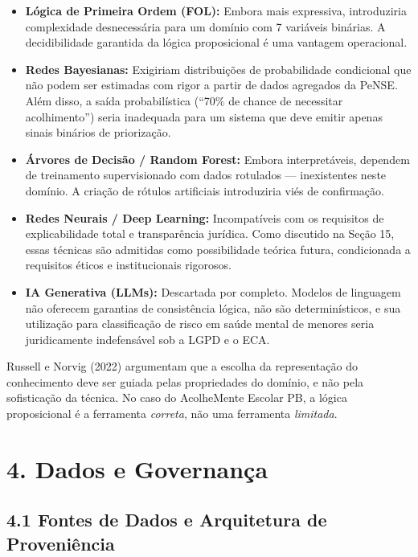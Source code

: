 \documentclass[11pt]{article}
\providecommand{\tightlist}{%
      \setlength{\itemsep}{0pt}\setlength{\parskip}{0pt}}
\begin{document}
\begin{itemize}
\tightlist
\item
  \textbf{Lógica de Primeira Ordem (FOL):} Embora mais expressiva,
  introduziria complexidade desnecessária para um domínio com 7
  variáveis binárias. A decidibilidade garantida da lógica proposicional
  é uma vantagem operacional.
\item
  \textbf{Redes Bayesianas:} Exigiriam distribuições de probabilidade
  condicional que não podem ser estimadas com rigor a partir de dados
  agregados da PeNSE. Além disso, a saída probabilística (``70\% de
  chance de necessitar acolhimento'') seria inadequada para um sistema
  que deve emitir apenas sinais binários de priorização.
\item
  \textbf{Árvores de Decisão / Random Forest:} Embora interpretáveis,
  dependem de treinamento supervisionado com dados rotulados ---
  inexistentes neste domínio. A criação de rótulos artificiais
  introduziria viés de confirmação.
\item
  \textbf{Redes Neurais / Deep Learning:} Incompatíveis com os
  requisitos de explicabilidade total e transparência jurídica. Como
  discutido na Seção 15, essas técnicas são admitidas como possibilidade
  teórica futura, condicionada a requisitos éticos e institucionais
  rigorosos.
\item
  \textbf{IA Generativa (LLMs):} Descartada por completo. Modelos de
  linguagem não oferecem garantias de consistência lógica, não são
  determinísticos, e sua utilização para classificação de risco em saúde
  mental de menores seria juridicamente indefensável sob a LGPD e o ECA.
\end{itemize}

Russell e Norvig (2022) argumentam que a escolha da representação do
conhecimento deve ser guiada pelas propriedades do domínio, e não pela
sofisticação da técnica. No caso do AcolheMente Escolar PB, a lógica
proposicional é a ferramenta \emph{correta}, não uma ferramenta
\emph{limitada}.

    \section{4. Dados e Governança}\label{dados-e-governanuxe7a}

\subsection{4.1 Fontes de Dados e Arquitetura de
Proveniência}\label{fontes-de-dados-e-arquitetura-de-proveniuxeancia}
\end{document}
